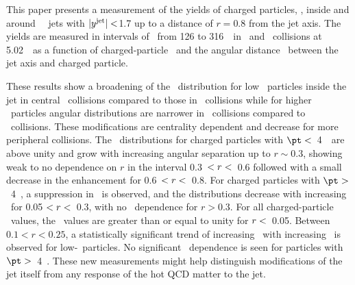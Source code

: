 
This paper presents a measurement of the yields of charged particles, \Dptr, inside and around \RFour\ \antikt\ jets with $|\mbox{$y^{\mathrm{jet}}$}| <$1.7 up to a distance of $r = 0.8$ from the jet axis.
The yields are measured in intervals of \ptjet\ from 126 to 316~\GeV\ in \PbPb\ and \pp\ collisions at 5.02~\TeV\ as a function of charged-particle \pt\ and the angular distance \rvar\ between the jet axis and charged particle.


These results show a broadening of the \Dptr\ distribution for low \pt\ particles inside the jet in central \pbpb\ collisions compared to those in \pp\ collisions while for higher \pt\ particles angular distributions are narrower in \pbpb\ collisions compared to \pp\ collisions.
These modifications are centrality dependent and decrease for more peripheral collisions.
The \RDptr\ distributions for charged particles with $\pt <$~4~\GeV\ are above unity and grow with increasing angular separation up to $r \sim0.3$, showing weak to no dependence on $r$ in the interval 0.3~$< \mbox{$r$} <$~0.6 followed with a small decrease in the enhancement for 0.6~$< \mbox{$r$} <$~0.8.
For charged particles with $\pt >$~4~\GeV, a suppression in \RDptr\ is observed, and the distributions decrease with increasing \rvar\ for 0.05 $ < \mbox{$r$} < $~0.3, with no \rvar\ dependence for $r>0.3$.
For all charged-particle \pt\ values, the \RDptr\ values are greater than or equal to unity for $\mbox{$r$} <$~0.05.
Between $0.1 < r < 0.25$, a statistically significant trend of increasing \RDptr\ with increasing \ptjet\ is observed for low-\pt\ particles.
No significant \ptjet\ dependence is seen for particles  with $\pt >$~4~\GeV.
These new measurements might help distinguish modifications of the jet itself from any response of the hot QCD matter to the jet.





